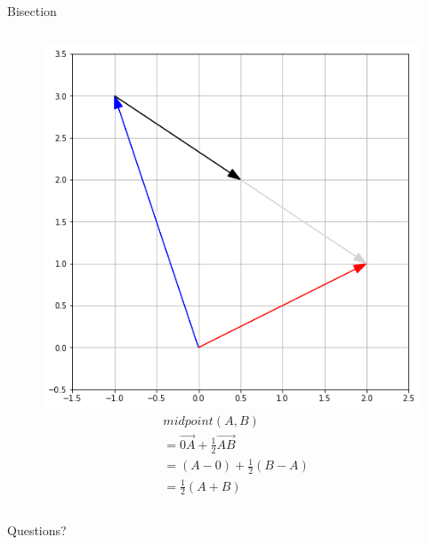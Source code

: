 \documentclass{beamer}
\begin{document}
\begin{frame}{Bisection}
  \begin{figure}
    \begin{columns}
      \hspace{-1cm}
      \includegraphics[scale=0.4]{bisection.png}
      \begin{align*}
        &midpoint(A,B)\\
        &= \overrightarrow{0A} + \frac{1}{2}\overrightarrow{AB}\\
                      &= (A-0) + \frac{1}{2}(B-A)\\
                      &= \frac{1}{2}(A+B)
      \end{align*}
    \end{columns}
  \end{figure}
\end{frame}


\begin{frame}
  Questions?
\end{frame}
\end{document}
